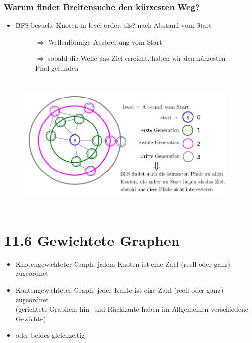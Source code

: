 \documentclass[11pt, fleqn]{scrreprt}
\begin{document}
	\subsubsection*{Warum findet Breitensuche den kürzesten Weg?}
	
	\begin{itemize}
		\item BFS besucht Knoten in level-order, als? nach Abstand vom Start
	\end{itemize}
	\begin{figure}[htbp]
		\begin{minipage}{5cm}
			\vspace*{0mm}
			\begin{itemize}
			\item[$\Rightarrow$] Wellenförmige Ausbreitung vom Start
			\item[$\Rightarrow$] sobald die Welle das Ziel erreicht, haben wir den kürzesten Pfad gefunden
			\end{itemize}
		\end{minipage}
		\begin{minipage}{10cm}
			\includegraphics[width=11cm,height=7cm,keepaspectratio]{./Pictures/kurWeg.png}
		\end{minipage}
	\end{figure}
		
	\section*{11.6 Gewichtete Graphen}
		\begin{itemize}
		\item Knotengewichteter Graph: jedem Knoten ist eine Zahl (reell oder ganz) zugeordnet
		\item Kantengewichteter Graph: jeder Kante ist eine Zahl (reell oder ganz) zugeordnet \\
		(gerichtete Graphen: hin- und Rückkante haben im Allgemeinen verschiedene Gewichte)
		\item oder beides gleichzeitig
		\end{itemize}
		
\end{document}
